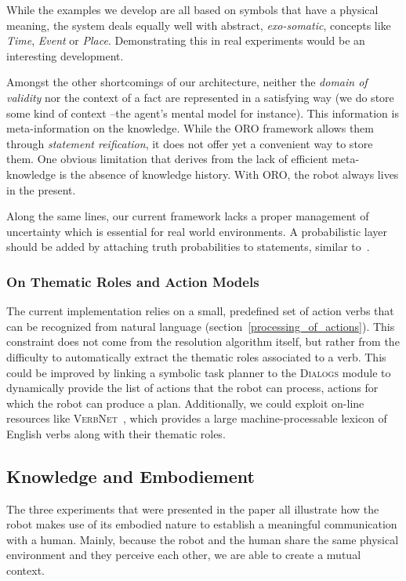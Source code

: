 While the examples we develop are all based on symbols that have a physical
meaning, the system deals equally well with abstract, \emph{exo-somatic},
concepts like \emph{Time}, \emph{Event} or \emph{Place}. Demonstrating this in
real experiments would be an interesting development.

Amongst the other shortcomings of our architecture, neither the \emph{domain of
validity} nor the context of a fact are represented in a satisfying way (we do
store some kind of context --the agent's mental model for instance). This
information is meta-information on the knowledge. While the ORO framework
allows them through \emph{statement reification}, it does not offer yet a
convenient way to store them. One obvious limitation that derives from the lack
of efficient meta-knowledge is the absence of knowledge history.  With ORO, the
robot always lives in the present.

Along the same lines, our current framework lacks a proper management of
uncertainty which is essential for real world environments. A probabilistic
layer should be added by attaching truth probabilities to statements, similar
to~\cite{Jain2009}.

\subsubsection{On Thematic Roles and Action Models}

The current implementation relies on a small, predefined set of action verbs
that can be recognized from natural language
(section~\ref{processing_of_actions}).  This constraint does not come from the
resolution algorithm itself, but rather from the difficulty to automatically
extract the thematic roles associated to a verb.  This could be improved by
linking a symbolic task planner to the \textsc{Dialogs} module to dynamically
provide the list of actions that the robot can process, \ie actions for which
the robot can produce a plan. Additionally, we could exploit on-line resources
like \textsc{VerbNet}~\cite{Kipper2008}, which provides a large
machine-processable lexicon of English verbs along with their thematic roles.

\subsection{Knowledge and Embodiement}

The three experiments that were presented in the paper all illustrate how the
robot makes use of its embodied nature to establish a meaningful communication
with a human. Mainly, because the robot and the human share the same physical
environment and they perceive each other, we are able to create a mutual
context.


